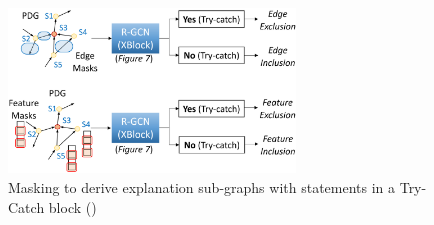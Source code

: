 
\begin{figure}[t]
	\centering
	\includegraphics[width=3in]{XAI.png}
        \vspace{-0.06in}
	\caption{Masking to derive explanation sub-graphs with statements in a Try-Catch block ({\xstate})}
        \vspace{-0.06in}
	\label{fig:GNNEX}	
\end{figure}




